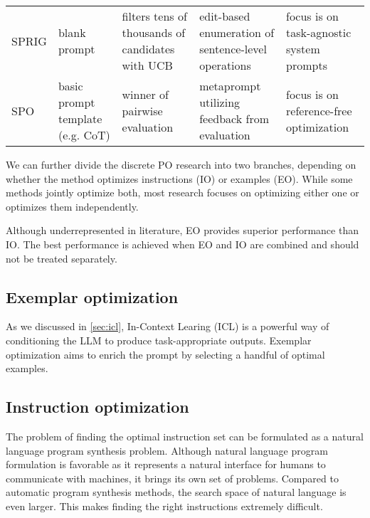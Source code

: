 \begin{landscape}
\begin{table}[htbp]
\begin{tabularx}{\linewidth}{@{}l Y Y Y Y@{}}
SPRIG\cite{zhang2024sprigimprovinglargelanguage} & blank prompt & filters tens of thousands of candidates with UCB & edit-based enumeration of sentence-level operations & focus is on task-agnostic system prompts \\
SPO\cite{xiang2025selfsupervisedpromptoptimization} & basic prompt template (e.g. CoT) & winner of pairwise evaluation & metaprompt utilizing feedback from evaluation & focus is on reference-free optimization\\
\bottomrule
\end{tabularx}
\end{table}
\end{landscape}

We can further divide the discrete PO research into two branches, depending on whether 
the method optimizes instructions (IO) or examples (EO). While some methods jointly optimize both, most
research focuses on optimizing either one or optimizes them independently. 

Although underrepresented in literature, EO provides superior performance than IO\cite{opsahlong2024optimizinginstructionsdemonstrationsmultistage}\cite{wan2024teachbettersmarterinstructions}.
The best performance is achieved when EO and IO are combined and should not be treated separately.



\subsection{Exemplar optimization}

As we discussed in \ref{sec:icl}, In-Context Learing (ICL) is a powerful way of conditioning the LLM to produce
task-appropriate outputs. Exemplar optimization aims to enrich the prompt by selecting a handful of optimal examples.



\subsection{Instruction optimization}
The problem of finding the optimal instruction set can be formulated as a natural language program synthesis problem\cite{zhou2023largelanguagemodelshumanlevel}.
Although natural language program formulation is favorable as it represents a 
natural interface for humans to communicate with machines, it brings its own set of problems.
Compared to automatic program synthesis methods, the search space of natural language is even larger. 
This makes finding the right instructions extremely difficult. 

